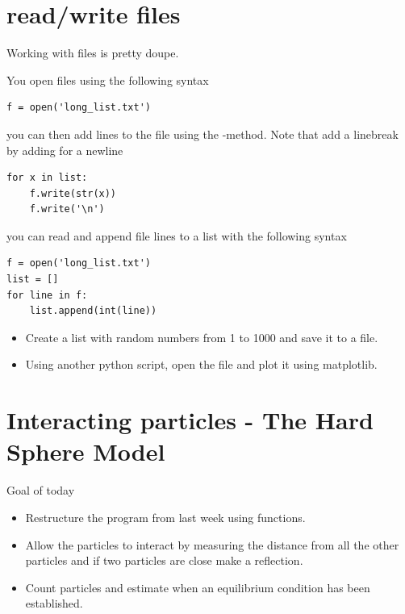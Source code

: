 \documentclass{article}
\begin{document}
\section{read/write files}

Working with files is pretty doupe.

You open files using the following syntax
\begin{lstlisting}
f = open('long_list.txt')
\end{lstlisting}

you can then add lines to the file using the -method.
Note that add a linebreak by adding \code{\\n} for a newline

\begin{lstlisting}
for x in list:
    f.write(str(x))
    f.write('\n')
\end{lstlisting}

you can read and append file lines to a list with the following syntax
\begin{lstlisting}
f = open('long_list.txt')
list = []
for line in f:
    list.append(int(line))
\end{lstlisting}


\begin{itemize}

    \item Create a list with random numbers from 1 to 1000 and save it to a file.

    \item Using another python script, open the file and plot it using matplotlib.

\end{itemize}




\newpage
\section{Interacting particles - The Hard Sphere Model}

Goal of today

\begin{itemize}
    \item Restructure the program from last week using functions.
    \item Allow the particles to interact by measuring the distance from all
        the other particles and if two particles are close make a reflection.
    \item Count particles and estimate when an equilibrium condition has been established.
\end{itemize}
\end{document}
